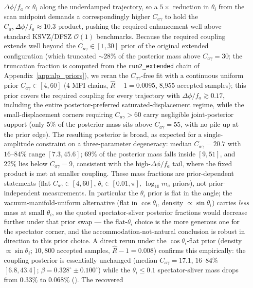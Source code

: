 \documentclass[aps,prd,twocolumn,superscriptaddress,showpacs,preprintnumbers,nofootinbib,longbibliography,floatfix]{revtex4-2}
\begin{document}
$\Delta\phi/f_a\propto\theta_i$ along the underdamped trajectory, so a
$5\times$ reduction in $\theta_i$ from the scan midpoint demands a
correspondingly higher $C_{a\gamma}$ to hold the
$C_{a\gamma}\,\Delta\phi/f_a\approx 10.3$ product, pushing the required
enhancement well above standard KSVZ/DFSZ $\mathcal{O}(1)$ benchmarks.
Because the required coupling extends well beyond the
$C_{a\gamma}\in[1,30]$ prior of the original extended configuration (which
truncated ${\sim}28\%$ of the posterior mass above $C_{a\gamma}=30$; the
truncation fraction is computed from the \texttt{run2\_extended} chain of
Appendix~\ref{app:alp_priors}), we reran
the $C_{a\gamma}$-free fit with a continuous uniform prior
$C_{a\gamma}\in[4,60]$ (4 MPI chains,
$\hat{R}-1=0.0095$, 8{,}955 accepted samples); this prior covers the
required coupling for every trajectory with $\Delta\phi/f_a \gtrsim 0.17$,
including the entire posterior-preferred saturated-displacement regime,
while the small-displacement corners requiring $C_{a\gamma} > 60$ carry
negligible joint-posterior support (only $5\%$ of the posterior mass sits
above $C_{a\gamma}=55$, with no pile-up at the prior edge). The resulting
posterior is broad, as expected for a single-amplitude constraint on a
three-parameter degeneracy: median $C_{a\gamma}=20.7$ with $16$--$84\%$
range $[7.3, 45.6]$; $69\%$ of the posterior mass falls inside $[9,51]$,
and 22\% lies below
$C_{a\gamma}=9$, consistent with the high-$\Delta\phi/f_a$ tail, where the
fixed product is met at smaller coupling. These mass fractions are
prior-dependent statements (flat $C_{a\gamma}\in[4,60]$,
$\theta_i\in[0.01,\pi]$, $\log_{10}m_a$ priors), not prior-independent
measurements. In particular the $\theta_i$ prior is flat in the angle;
the vacuum-manifold-uniform alternative (flat in $\cos\theta_i$, density
$\propto\sin\theta_i$) carries \emph{less} mass at small $\theta_i$, so
the quoted spectator-sliver posterior fractions would decrease further
under that prior swap --- the flat-$\theta_i$ choice is the more
generous one for the spectator corner, and the accommodation-not-natural
conclusion is robust in direction to this prior choice. A direct rerun
under the $\cos\theta_i$-flat prior (density $\propto\sin\theta_i$;
$10{,}800$ accepted samples, $\hat R-1=0.008$) confirms this empirically:
the coupling posterior is essentially unchanged (median
$C_{a\gamma}=17.1$, $16$--$84\%$ $[6.8,43.4]$;
$\beta=0.328^\circ\pm 0.100^\circ$) while the $\theta_i\le 0.1$
spectator-sliver mass drops from $0.33\%$ to $0.068\%$
(). The recovered
\end{document}
